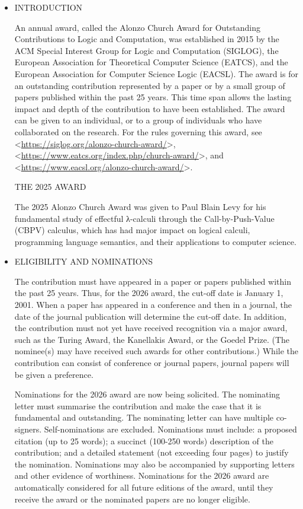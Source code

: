 \documentclass[prodmode,acmtecs]{acmsmall} %
\begin{document}
\begin{itemize}\item  INTRODUCTION 
 
  An annual award, called the Alonzo Church Award for Outstanding Contributions to Logic and Computation, was established in 2015 by the ACM Special Interest Group for Logic and Computation (SIGLOG), the European Association for Theoretical Computer Science (EATCS), and the European Association for Computer Science Logic (EACSL).  The award is for an outstanding contribution represented by a paper or by a small group of papers published within the past 25 years.  This time span allows the lasting impact and depth of the contribution to have been established. The award can be given to an individual, or to a group of individuals who have collaborated on the research. For the rules governing this award, see <\href{https://siglog.org/alonzo-church-award/}{https://siglog.org/alonzo-church-award/}>, <\href{https://www.eatcs.org/index.php/church-award/}{https://www.eatcs.org/index.php/church-award/}>, and <\href{https://www.eacsl.org/alonzo-church-award/}{https://www.eacsl.org/alonzo-church-award/}>. 
 
  THE 2025 AWARD 
 
  The 2025 Alonzo Church Award was given to Paul Blain Levy for his fundamental study of effectful λ-calculi through the Call-by-Push-Value (CBPV) calculus, which has had major impact on logical calculi, programming language semantics, and their applications to computer science. 
 
\item  ELIGIBILITY AND NOMINATIONS 
 
  The contribution must have appeared in a paper or papers published within the past 25 years.  Thus, for the 2026 award, the cut-off date is January 1, 2001.  When a paper has appeared in a conference and then in a journal, the date of the journal publication will determine the cut-off date.  In addition, the contribution must not yet have received recognition via a major award, such as the Turing Award, the Kanellakis Award, or the Goedel Prize.  (The nominee(s) may have received such awards for other contributions.)  While the contribution can consist of conference or journal papers, journal papers will be given a preference. 
 
  Nominations for the 2026 award are now being solicited.  The nominating letter must summarise the contribution and make the case that it is fundamental and outstanding.  The nominating letter can have multiple co-signers.  Self-nominations are excluded.  Nominations must include: a proposed citation (up to 25 words); a succinct (100-250 words) description of the contribution; and a detailed statement (not exceeding four pages) to justify the nomination.  Nominations may also be accompanied by supporting letters and other evidence of worthiness.  Nominations for the 2026 award are automatically considered for all future editions of the award, until they receive the award or the nominated papers are no longer eligible. 
 

\end{itemize}
\end{document}
